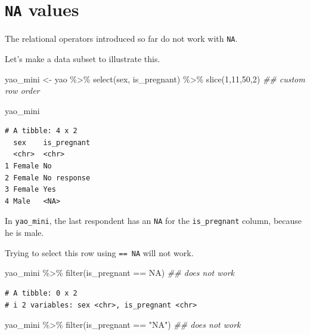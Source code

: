 \documentclass[
  letterpaper,
  DIV=11,
  numbers=noendperiod]{scrreprt}
\newenvironment{Shaded}{\begin{snugshade}}{\end{snugshade}}
\newcommand{\ConstantTok}[1]{\textcolor[rgb]{0.56,0.35,0.01}{#1}}
\newcommand{\DecValTok}[1]{\textcolor[rgb]{0.68,0.00,0.00}{#1}}
\newcommand{\DocumentationTok}[1]{\textcolor[rgb]{0.37,0.37,0.37}{\textit{#1}}}
\newcommand{\FunctionTok}[1]{\textcolor[rgb]{0.28,0.35,0.67}{#1}}
\newcommand{\NormalTok}[1]{\textcolor[rgb]{0.00,0.23,0.31}{#1}}
\newcommand{\OtherTok}[1]{\textcolor[rgb]{0.00,0.23,0.31}{#1}}
\newcommand{\SpecialCharTok}[1]{\textcolor[rgb]{0.37,0.37,0.37}{#1}}
\newcommand{\StringTok}[1]{\textcolor[rgb]{0.13,0.47,0.30}{#1}}
\begin{document}
\section{\texorpdfstring{\texttt{NA}
values}{NA values}}\label{na-values}

The relational operators introduced so far do not work with \texttt{NA}.

Let's make a data subset to illustrate this.

\begin{Shaded}
\begin{Highlighting}[]
\NormalTok{yao\_mini }\OtherTok{\textless{}{-}}\NormalTok{ yao }\SpecialCharTok{\%\textgreater{}\%} 
  \FunctionTok{select}\NormalTok{(sex, is\_pregnant) }\SpecialCharTok{\%\textgreater{}\%} 
  \FunctionTok{slice}\NormalTok{(}\DecValTok{1}\NormalTok{,}\DecValTok{11}\NormalTok{,}\DecValTok{50}\NormalTok{,}\DecValTok{2}\NormalTok{) }\DocumentationTok{\#\# custom row order}

\NormalTok{yao\_mini}
\end{Highlighting}
\end{Shaded}

\begin{verbatim}
# A tibble: 4 x 2
  sex    is_pregnant
  <chr>  <chr>      
1 Female No         
2 Female No response
3 Female Yes        
4 Male   <NA>       
\end{verbatim}

In \texttt{yao\_mini}, the last respondent has an \texttt{NA} for the
\texttt{is\_pregnant} column, because he is male.

Trying to select this row using \texttt{==\ NA} will not work.

\begin{Shaded}
\begin{Highlighting}[]
\NormalTok{yao\_mini }\SpecialCharTok{\%\textgreater{}\%} \FunctionTok{filter}\NormalTok{(is\_pregnant }\SpecialCharTok{==} \ConstantTok{NA}\NormalTok{) }\DocumentationTok{\#\# does not work}
\end{Highlighting}
\end{Shaded}

\begin{verbatim}
# A tibble: 0 x 2
# i 2 variables: sex <chr>, is_pregnant <chr>
\end{verbatim}

\begin{Shaded}
\begin{Highlighting}[]
\NormalTok{yao\_mini }\SpecialCharTok{\%\textgreater{}\%} \FunctionTok{filter}\NormalTok{(is\_pregnant }\SpecialCharTok{==} \StringTok{"NA"}\NormalTok{) }\DocumentationTok{\#\# does not work}
\end{Highlighting}
\end{Shaded}
\end{document}
